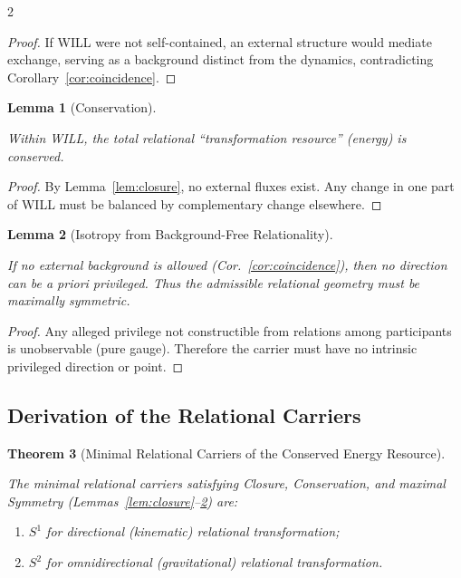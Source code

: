 \documentclass[10pt, a4paper]{article}
\newtheorem{theorem}{Theorem}[section]
\newtheorem{lemma}[theorem]{Lemma}
\begin{document}
\begin{multicols}{2}
\begin{proof}
If WILL were not self-contained, an external structure would mediate exchange, serving as a background distinct from the dynamics, contradicting Corollary~\ref{cor:coincidence}.
\end{proof}

\begin{lemma}[Conservation]
\hypertarget{lem:conservation}{}\label{lem:conservation}
Within WILL, the total relational ``transformation resource'' (energy) is conserved.
\end{lemma}

\begin{proof}
By Lemma~\ref{lem:closure}, no external fluxes exist. Any change in one part of WILL must be balanced by complementary change elsewhere.
\end{proof}

\begin{lemma}[Isotropy from Background-Free Relationality]
\hypertarget{lem:isotropy}{}\label{lem:isotropy}
If no external background is allowed (Cor.~\ref{cor:coincidence}), then no direction can be \emph{a priori} privileged. Thus the admissible relational geometry must be maximally symmetric.
\end{lemma}

\begin{proof}
Any alleged privilege not constructible from relations among participants is unobservable (pure gauge). Therefore the carrier must have no intrinsic privileged direction or point.
\end{proof}

\subsection{Derivation of the Relational Carriers}

\begin{theorem}[Minimal Relational Carriers of the Conserved Energy Resource]
\hypertarget{thm:carriers}{}\label{thm:carriers}
The minimal relational carriers satisfying Closure, Conservation, and maximal Symmetry (Lemmas~\ref{lem:closure}--\ref{lem:isotropy}) are:
    \begin{enumerate}[label=(\alph*),nosep]
        \item $S^1$ for \emph{directional} (kinematic) relational transformation;
        \item $S^2$ for \emph{omnidirectional} (gravitational) relational transformation.
    \end{enumerate}
\end{theorem}


\end{multicols}
\end{document}
